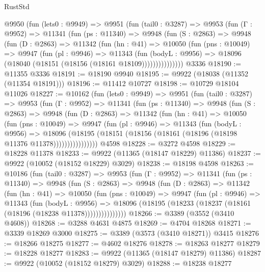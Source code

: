 \begin{lexlean}{RustStd}
\begin{coremodule}
    @9950
      (fun (lets0 : @9949) =>
      @9951
        (fun (tail0 : @3287) =>
        @9953
          (fun (Γ : @9952) =>
          @11341
            (fun (ps : @11340) =>
            @9948
              (fun (S : @2863) =>
              @9948
                (fun (D : @2863) =>
                @11342
                  (fun (hn : @41) =>
                  @10050
                    (fun (pns : @10049) =>
                    @9947
                      (fun (pl : @9946) =>
                      @11343
                        (fun (bodyL : @9956) =>
                        @18096 (@18040 (@18151 (@18156 (@18161 @18109)))))))))))))))
    @3336
@18190 := @11355 @3336
@18191 := @18190 @9940
@18195 := @9922 (@18038 (@11352 (@11354 @18191)))
@18196 := @11412 @10727
@18198 := @10729 @18104 @11026
@18227 := @10162
    (fun (lets0 : @9949) =>
    @9951
      (fun (tail0 : @3287) =>
      @9953
        (fun (Γ : @9952) =>
        @11341
          (fun (ps : @11340) =>
          @9948
            (fun (S : @2863) =>
            @9948
              (fun (D : @2863) =>
              @11342
                (fun (hn : @41) =>
                @10050
                  (fun (pns : @10049) =>
                  @9947
                    (fun (pl : @9946) =>
                    @11343
                      (fun (bodyL : @9956) =>
                      @18096
                        (@18195
                          (@18151 (@18156 (@18161 (@18196 (@18198 @11376 @11378))))))))))))))))
    @4598
@18228 := @3272 @4598
@18229 := @18228 @11378
@18233 := @9922 (@11365 (@18147 @18229) @11386)
@18237 := @9922 (@10052 (@18152 @18229) @3029)
@18238 := @18198 @4598
@18263 := @10186
    (fun (tail0 : @3287) =>
    @9953
      (fun (Γ : @9952) =>
      @11341
        (fun (ps : @11340) =>
        @9948
          (fun (S : @2863) =>
          @9948
            (fun (D : @2863) =>
            @11342
              (fun (hn : @41) =>
              @10050
                (fun (pns : @10049) =>
                @9947
                  (fun (pl : @9946) =>
                  @11343
                    (fun (bodyL : @9956) =>
                    @18096 (@18195 (@18233 (@18237 (@18161 (@18196 (@18238 @11378)))))))))))))))
@18266 := @3389 (@3552 (@3410 @4608))
@18268 := @3288 @4631 @4875
@18269 := @4704 @18268
@18271 := @3339 @18269 @3000
@18275 := @3389 (@3573 (@3410 @18271)) @3415
@18276 := @18266 @18275
@18277 := @4602 @18276
@18278 := @18263 @18277
@18279 := @18228 @18277
@18283 := @9922 (@11365 (@18147 @18279) @11386)
@18287 := @9922 (@10052 (@18152 @18279) @3029)
@18288 := @18238 @18277

\end{coremodule}
\end{lexlean}
